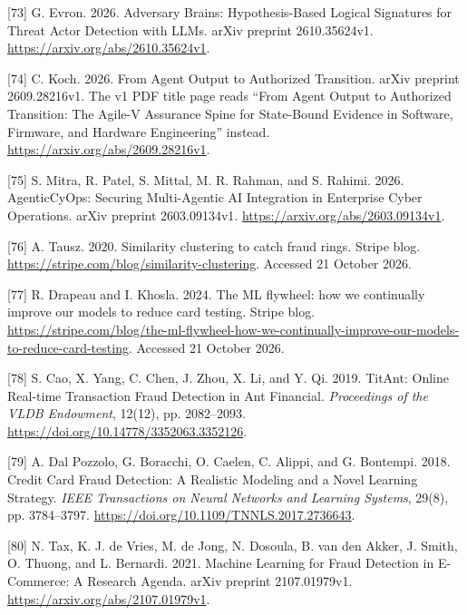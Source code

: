 \documentclass[
  11pt,
]{article}
\newlength{\cslhangindent}
\newlength{\cslentryspacingunit} %
\newenvironment{CSLReferences}[2] %
 {%
  \setlength{\parindent}{0pt}
  \ifodd #1
  \let\oldpar\par
  \def\par{\hangindent=\cslhangindent\oldpar}
  \fi
  \setlength{\parskip}{#2\cslentryspacingunit}
 }%
 {}
\begin{document}
\begin{CSLReferences}{1}{1}
\leavevmode{}%
{[}73{]} G. Evron. 2026. Adversary Brains: Hypothesis-Based Logical
Signatures for Threat Actor Detection with LLMs. arXiv preprint
2610.35624v1. \url{https://arxiv.org/abs/2610.35624v1}.

\leavevmode{}%
{[}74{]} C. Koch. 2026. From Agent Output to Authorized Transition.
arXiv preprint 2609.28216v1. The v1 PDF title page reads ``From Agent
Output to Authorized Transition: The Agile-V Assurance Spine for
State-Bound Evidence in Software, Firmware, and Hardware Engineering''
instead. \url{https://arxiv.org/abs/2609.28216v1}.

\leavevmode{}%
{[}75{]} S. Mitra, R. Patel, S. Mittal, M. R. Rahman, and S. Rahimi.
2026. AgenticCyOps: Securing Multi-Agentic AI Integration in Enterprise
Cyber Operations. arXiv preprint 2603.09134v1.
\url{https://arxiv.org/abs/2603.09134v1}.

\leavevmode{}%
{[}76{]} A. Tausz. 2020. Similarity clustering to catch fraud rings.
Stripe blog. \url{https://stripe.com/blog/similarity-clustering}.
Accessed 21 October 2026.

\leavevmode{}%
{[}77{]} R. Drapeau and I. Khosla. 2024. The ML flywheel: how we
continually improve our models to reduce card testing. Stripe blog.
\url{https://stripe.com/blog/the-ml-flywheel-how-we-continually-improve-our-models-to-reduce-card-testing}.
Accessed 21 October 2026.

\leavevmode{}%
{[}78{]} S. Cao, X. Yang, C. Chen, J. Zhou, X. Li, and Y. Qi. 2019.
TitAnt: Online Real-time Transaction Fraud Detection in Ant Financial.
\emph{Proceedings of the VLDB Endowment}, 12(12), pp. 2082--2093.
\url{https://doi.org/10.14778/3352063.3352126}.

\leavevmode{}%
{[}79{]} A. Dal Pozzolo, G. Boracchi, O. Caelen, C. Alippi, and G.
Bontempi. 2018. Credit Card Fraud Detection: A Realistic Modeling and a
Novel Learning Strategy. \emph{IEEE Transactions on Neural Networks and
Learning Systems}, 29(8), pp. 3784--3797.
\url{https://doi.org/10.1109/TNNLS.2017.2736643}.

\leavevmode{}%
{[}80{]} N. Tax, K. J. de Vries, M. de Jong, N. Dosoula, B. van den
Akker, J. Smith, O. Thuong, and L. Bernardi. 2021. Machine Learning for
Fraud Detection in E-Commerce: A Research Agenda. arXiv preprint
2107.01979v1. \url{https://arxiv.org/abs/2107.01979v1}.


\end{CSLReferences}
\end{document}
